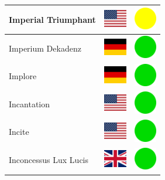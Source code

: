 \documentclass[12pt, a4paper, twoside]{report}
\begin{document}
\begin{center}
\begin{longtable}{|p{5cm}|p{2cm}|p{2cm}|}
 Imperial Triumphant                                        & \includegraphics[width=1cm]{../img/flags/us} &   \includegraphics[width=1cm]{../likes/m} \\ \hline
 Imperium Dekadenz                                          & \includegraphics[width=1cm]{../img/flags/de} &   \includegraphics[width=1cm]{../likes/y} \\ \hline
 Implore                                                    & \includegraphics[width=1cm]{../img/flags/de} &   \includegraphics[width=1cm]{../likes/y} \\ \hline
 Incantation                                                & \includegraphics[width=1cm]{../img/flags/us} &   \includegraphics[width=1cm]{../likes/y} \\ \hline
 Incite                                                     & \includegraphics[width=1cm]{../img/flags/us} &   \includegraphics[width=1cm]{../likes/y} \\ \hline
 Inconcessus Lux Lucis                                      & \includegraphics[width=1cm]{../img/flags/gb} &   \includegraphics[width=1cm]{../likes/y} \\ \hline

\end{longtable}
\end{center}
\end{document}

